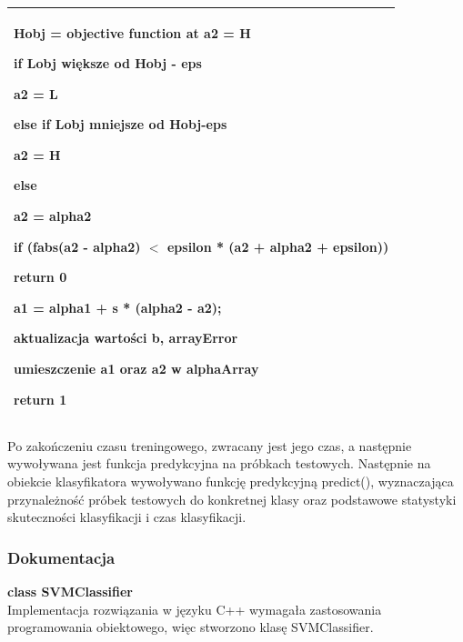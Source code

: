 \documentclass[[10pt,a4paper]{article}
\begin{document}
\begin{enumerate}
\begin{itemize}
\begin{tabular}{|p{11.5cm}|}
\hspace{1em} Hobj = objective function at a2 = H

 \hspace{1em}\textbf{if }Lobj większe od Hobj - eps

  \hspace{2em}a2 = L

 \hspace{1em}\textbf{else if} Lobj mniejsze od Hobj-eps

  \hspace{2em}a2 = H

 \hspace{1em}\textbf{else}

  \hspace{2em}a2 = alpha2

\noindent \textbf{if} (fabs(a2 - alpha2) $<$ epsilon * (a2 + alpha2 + epsilon)) 

  \hspace{1em}return 0

\noindent a1 = alpha1 + s * (alpha2 - a2); 

\noindent aktualizacja wartości b, arrayError

\noindent umieszczenie a1 oraz a2 w alphaArray

\noindent return 1

\noindent \textbf{}
\\ \hline
\end{tabular}

 Po zakończeniu czasu treningowego, zwracany jest jego czas, a następnie wywoływana jest funkcja predykcyjna na próbkach testowych. Następnie na obiekcie klasyfikatora wywoływano funkcję predykcyjną predict(), wyznaczająca przynależność próbek testowych do konkretnej klasy oraz podstawowe statystyki skuteczności klasyfikacji i czas klasyfikacji.

\subsubsection{Dokumentacja}

\textbf{class SVMClassifier}\\ Implementacja rozwiązania w języku C++ wymagała zastosowania programowania obiektowego, więc stworzono klasę SVMClassifier. \\


\end{itemize}
\end{enumerate}
\end{document}
